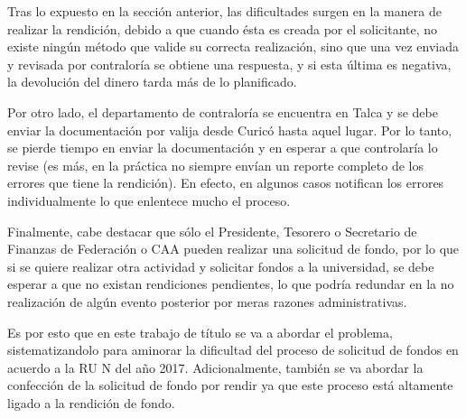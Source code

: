 Tras lo expuesto en la sección anterior, las dificultades surgen en la manera de realizar la rendición, debido a que cuando ésta es creada por el solicitante, no existe ningún método que valide su correcta realización, sino que una vez enviada y revisada por contraloría se obtiene una respuesta, y si esta última es negativa, la devolución del dinero tarda más de lo planificado.

Por otro lado, el departamento de contraloría se encuentra en Talca y se debe enviar la documentación por valija desde Curicó hasta aquel lugar. Por lo tanto, se pierde tiempo en enviar la documentación y en esperar a que controlaría lo revise (es más, en la práctica no siempre envían un reporte completo de los errores que tiene la rendición). En efecto, en algunos casos notifican los errores individualmente lo que enlentece mucho el proceso.

Finalmente, cabe destacar que sólo el Presidente, Tesorero o Secretario de Finanzas de Federación o CAA pueden realizar una solicitud de fondo, por lo que si se quiere realizar otra actividad y solicitar fondos a la universidad, se debe esperar a que no existan rendiciones pendientes, lo que podría redundar en la no realización de algún evento posterior por meras razones administrativas.

Es por esto que en este trabajo de título se va a abordar el problema, sistematizandolo para aminorar la dificultad del proceso de solicitud de fondos en acuerdo a la RU N  del año 2017. Adicionalmente, también se va abordar la confección de la solicitud de fondo por rendir ya que este proceso está altamente ligado a la rendición de fondo.
